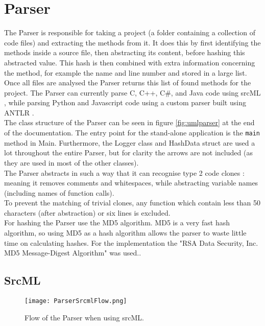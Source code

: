 \documentclass[../Main.tex]{subfiles}
\begin{document}
\section{Parser}
The Parser is responsible for taking a project (a folder containing a collection of code files) and extracting the methods from it. It does this by first identifying the methods inside a source file, then abstracting its content, before hashing this abstracted value. This hash is then combined with extra information concerning the method, for example the name and line number and stored in a large list. Once all files are analysed the Parser returns this list of found methods for the project. The Parser can currently parse C, C++, C\#, and Java code using srcML \cite{srcML}, while parsing Python and Javascript code using a custom parser built using ANTLR \cite{ANTLR}.\\

The class structure of the Parser can be seen in figure \cref{fig:umlparser} at the end of the documentation. The entry point for the stand-alone application is the \texttt{main} method in Main. Furthermore, the Logger class and HashData struct are used a lot throughout the entire Parser, but for clarity the arrows are not included (as they are used in most of the other classes).\\

The Parser abstracts in such a way that it can recognise type 2 code clones \cite{VUDDY, code_clones_1, code_clones_2}: meaning it removes comments and whitespaces, while abstracting variable names (including names of function calls).\\

To prevent the matching of trivial clones, any function which contain less than 50 characters (after abstraction) or six lines is excluded.\\

For hashing the Parser use the MD5 algorithm. MD5 is a very fast hash algorithm, so using MD5 as a hash algorithm allows the parser to waste little time on calculating hashes. For the implementation the "RSA Data Security, Inc. MD5 Message-Digest Algorithm" was used..


\subsection{SrcML}

\begin{figure}[h]
    \centering
    \texttt{[image: ParserSrcmlFlow.png]} 
    \caption{Flow of the Parser when using srcML.}
    \label{fig:srcmlParserFlow}
\end{figure}
\end{document}
